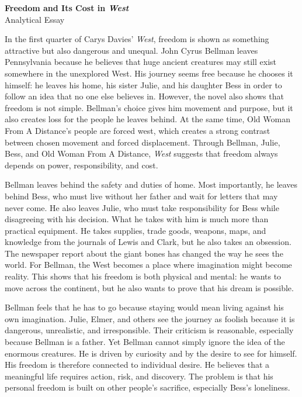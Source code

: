 \documentclass[11pt,a4paper]{article}
\begin{document}
\begin{center}
    {\Huge\bfseries Freedom and Its Cost in \textit{West}}\\[0.5em]
    {\Large Analytical Essay}
\end{center}

\vspace{1em}

In the first quarter of Carys Davies' \textit{West}, freedom is shown as something attractive but also dangerous and unequal. John Cyrus Bellman leaves Pennsylvania because he believes that huge ancient creatures may still exist somewhere in the unexplored West. His journey seems free because he chooses it himself: he leaves his home, his sister Julie, and his daughter Bess in order to follow an idea that no one else believes in. However, the novel also shows that freedom is not simple. Bellman's choice gives him movement and purpose, but it also creates loss for the people he leaves behind. At the same time, Old Woman From A Distance's people are forced west, which creates a strong contrast between chosen movement and forced displacement. Through Bellman, Julie, Bess, and Old Woman From A Distance, \textit{West} suggests that freedom always depends on power, responsibility, and cost.

Bellman leaves behind the safety and duties of home. Most importantly, he leaves behind Bess, who must live without her father and wait for letters that may never come. He also leaves Julie, who must take responsibility for Bess while disagreeing with his decision. What he takes with him is much more than practical equipment. He takes supplies, trade goods, weapons, maps, and knowledge from the journals of Lewis and Clark, but he also takes an obsession. The newspaper report about the giant bones has changed the way he sees the world. For Bellman, the West becomes a place where imagination might become reality. This shows that his freedom is both physical and mental: he wants to move across the continent, but he also wants to prove that his dream is possible.

Bellman feels that he has to go because staying would mean living against his own imagination. Julie, Elmer, and others see the journey as foolish because it is dangerous, unrealistic, and irresponsible. Their criticism is reasonable, especially because Bellman is a father. Yet Bellman cannot simply ignore the idea of the enormous creatures. He is driven by curiosity and by the desire to see for himself. His freedom is therefore connected to individual desire. He believes that a meaningful life requires action, risk, and discovery. The problem is that his personal freedom is built on other people's sacrifice, especially Bess's loneliness.
\end{document}
